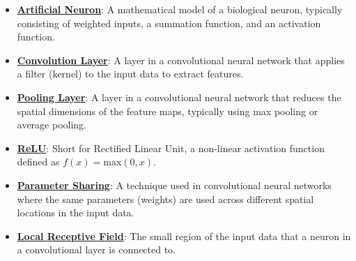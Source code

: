 \documentclass{article}%
\begin{document}
\begin{itemize}[leftmargin=*]
\item \href{https://purdue.brightspace.com/d2l/common/assets/pdfjs-d2l-dist/1.0.14-legacy/web/viewer.html?file=\%2Fcontent\%2Fenforced\%2F1095467-wl.202510.CS.24300.001\%2F09L1-cnn.pdf\%3Fou\%3D1095467\&lang=en-us\&container=d2l-fileviewer-rendered-pdf\&fullscreen=d2l-fileviewer-rendered-pdf-dialog\&height=667#page=5}{\textbf{Artificial Neuron}}: A mathematical model of a biological neuron, typically consisting of weighted inputs, a summation function, and an activation function.%
\item \href{https://purdue.brightspace.com/d2l/common/assets/pdfjs-d2l-dist/1.0.14-legacy/web/viewer.html?file=\%2Fcontent\%2Fenforced\%2F1095467-wl.202510.CS.24300.001\%2F09L1-cnn.pdf\%3Fou\%3D1095467\&lang=en-us\&container=d2l-fileviewer-rendered-pdf\&fullscreen=d2l-fileviewer-rendered-pdf-dialog\&height=667#page=6}{\textbf{Convolution Layer}}: A layer in a convolutional neural network that applies a filter (kernel) to the input data to extract features.%
\item \href{https://purdue.brightspace.com/d2l/common/assets/pdfjs-d2l-dist/1.0.14-legacy/web/viewer.html?file=\%2Fcontent\%2Fenforced\%2F1095467-wl.202510.CS.24300.001\%2F09L1-cnn.pdf\%3Fou\%3D1095467\&lang=en-us\&container=d2l-fileviewer-rendered-pdf\&fullscreen=d2l-fileviewer-rendered-pdf-dialog\&height=667#page=6}{\textbf{Pooling Layer}}: A layer in a convolutional neural network that reduces the spatial dimensions of the feature maps, typically using max pooling or average pooling.%
\item \href{https://purdue.brightspace.com/d2l/common/assets/pdfjs-d2l-dist/1.0.14-legacy/web/viewer.html?file=\%2Fcontent\%2Fenforced\%2F1095467-wl.202510.CS.24300.001\%2F09L1-cnn.pdf\%3Fou\%3D1095467\&lang=en-us\&container=d2l-fileviewer-rendered-pdf\&fullscreen=d2l-fileviewer-rendered-pdf-dialog\&height=667#page=13}{\textbf{ReLU}}: Short for Rectified Linear Unit, a non-linear activation function defined as $f(x) = \text{max}(0, x)$.%
\item \href{https://purdue.brightspace.com/d2l/common/assets/pdfjs-d2l-dist/1.0.14-legacy/web/viewer.html?file=\%2Fcontent\%2Fenforced\%2F1095467-wl.202510.CS.24300.001\%2F09L1-cnn.pdf\%3Fou\%3D1095467\&lang=en-us\&container=d2l-fileviewer-rendered-pdf\&fullscreen=d2l-fileviewer-rendered-pdf-dialog\&height=667#page=12}{\textbf{Parameter Sharing}}: A technique used in convolutional neural networks where the same parameters (weights) are used across different spatial locations in the input data.%
\item \href{https://purdue.brightspace.com/d2l/common/assets/pdfjs-d2l-dist/1.0.14-legacy/web/viewer.html?file=\%2Fcontent\%2Fenforced\%2F1095467-wl.202510.CS.24300.001\%2F09L1-cnn.pdf\%3Fou\%3D1095467\&lang=en-us\&container=d2l-fileviewer-rendered-pdf\&fullscreen=d2l-fileviewer-rendered-pdf-dialog\&height=667#page=10}{\textbf{Local Receptive Field}}: The small region of the input data that a neuron in a convolutional layer is connected to.%

\end{itemize}
\end{document}
